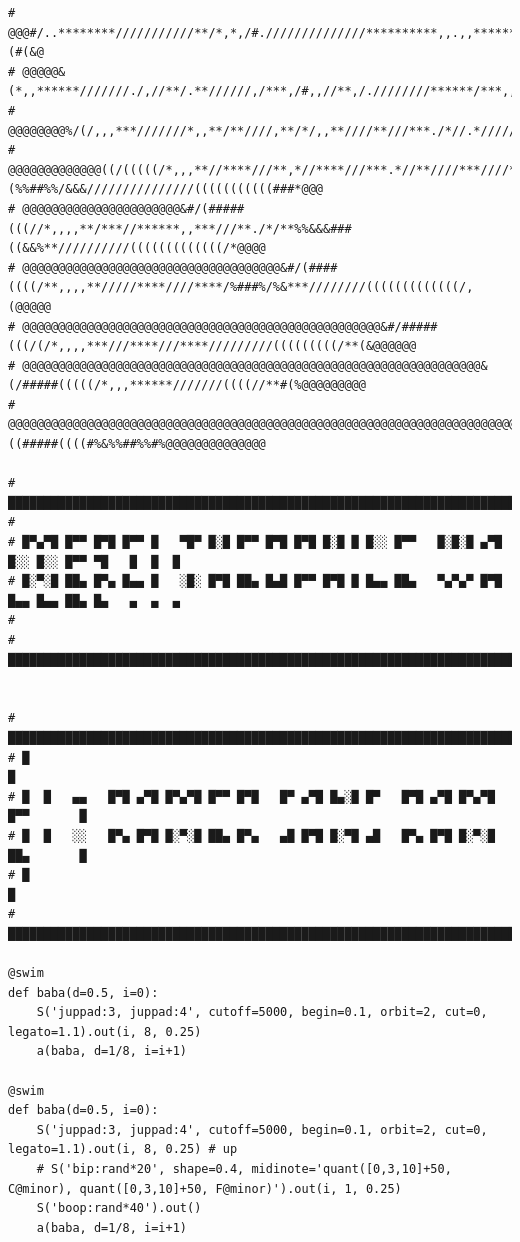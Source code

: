 \documentclass[11pt]{article}
\begin{document}
\begin{enumerate}
\begin{verbatim}
# @@@#/..********///////////**/*,*,/#.//////////////**********,,.,,**********//*,,,,,,,.,***********,.....,*/*,*(#(&@
# @@@@@&(*,,******///////./,//**/.**//////,/***,/#,,//**,/.////////******/***,,..,,*,...,,**/*,,**,*//*/*****/((#%*@@
# @@@@@@@@%/(/,,,***///////*,,**/**////,**/*/,,**////**///***./*//.*/////////////*******/*,,******,,*//#/(//(((##*%@@
# @@@@@@@@@@@@@((/(((((/*,,,**//****///**,*//****///***.*//**////***////*(%%##%%/&&&///////////////(((((((((((###*@@@
# @@@@@@@@@@@@@@@@@@@@@@&#/(#####(((//*,,,,**/***//******,,***///**./*/**%%&&&###((&&%**//////////(((((((((((((/*@@@@
# @@@@@@@@@@@@@@@@@@@@@@@@@@@@@@@@@@@@&#/(####((((/**,,,,**/////****////****/%###%/%&***////////(((((((((((((/,(@@@@@
# @@@@@@@@@@@@@@@@@@@@@@@@@@@@@@@@@@@@@@@@@@@@@@@@@@&#/#####(((/(/*,,,,***///****///****/////////(((((((((/**(&@@@@@@
# @@@@@@@@@@@@@@@@@@@@@@@@@@@@@@@@@@@@@@@@@@@@@@@@@@@@@@@@@@@@@@@@&(/#####(((((/*,,,******///////((((//**#(%@@@@@@@@@
# @@@@@@@@@@@@@@@@@@@@@@@@@@@@@@@@@@@@@@@@@@@@@@@@@@@@@@@@@@@@@@@@@@@@@@@@@@@@@@&((#####((((#%&%%##%%#%@@@@@@@@@@@@@@

# ███████████████████████████████████████████████████████████████████████████████████████████████████████████████████
#
# █▀▄▀█ █▀▀ █▀█ █▀▀ █   ▀█▀ █░█ █▀▀ █▀█ █▀█ █░█ █ █░░ █▀▀   █░█░█ ▄▀█ █░░ █░░ █▀▀ ▀█   █  █  █
# █░▀░█ ██▄ █▀▄ █▄▄ █   ░█░ █▀█ ██▄ █▄█ █▀▀ █▀█ █ █▄▄ ██▄   ▀▄▀▄▀ █▀█ █▄▄ █▄▄ ██▄ █▄   ▄  ▄  ▄
#
# ███████████████████████████████████████████████████████████████████████████████████████████████████████████████████


# ██████████████████████████████████████████████████████████████████████████████
# █                                                                            █
# █  █   ▄▄   █▀█ ▄▀█ █▀▄▀█ █▀▀ █▀█   █▀ ▄▀█ █▄░█ █▀   █▀█ ▄▀█ █▀▄▀█ █▀▀       █
# █  █   ░░   █▀▄ █▀█ █░▀░█ ██▄ █▀▄   ▄█ █▀█ █░▀█ ▄█   █▀▄ █▀█ █░▀░█ ██▄       █
# █                                                                            █
# ██████████████████████████████████████████████████████████████████████████████

@swim
def baba(d=0.5, i=0):
    S('juppad:3, juppad:4', cutoff=5000, begin=0.1, orbit=2, cut=0, legato=1.1).out(i, 8, 0.25)
    a(baba, d=1/8, i=i+1)

@swim
def baba(d=0.5, i=0):
    S('juppad:3, juppad:4', cutoff=5000, begin=0.1, orbit=2, cut=0, legato=1.1).out(i, 8, 0.25) # up
    # S('bip:rand*20', shape=0.4, midinote='quant([0,3,10]+50, C@minor), quant([0,3,10]+50, F@minor)').out(i, 1, 0.25)
    S('boop:rand*40').out()
    a(baba, d=1/8, i=i+1)


\end{verbatim}
\end{enumerate}
\end{document}
